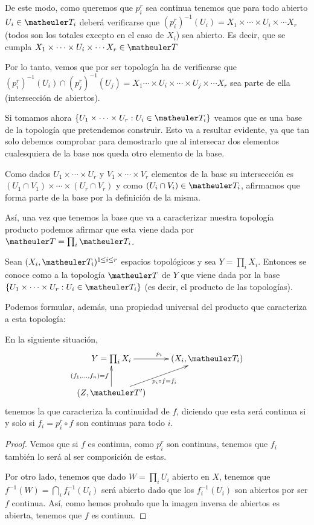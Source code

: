 De este modo, como queremos que $p_i^r$ sea continua  tenemos que para todo abierto $U_i\in \T_i$ deberá verificarse que $(p_i^r)^{-1}(U_i)=X_1\times\cdots\times U_i\times\cdots X_r$ (todos son los totales excepto en el caso de $X_i$) sea abierto. Es decir, que se cumpla $X_1\times\cdots\times U_i \times\cdots X_r\in \T$

Por lo tanto, vemos que por ser topología ha de verificarse que $(p_i^r)^{-1}(U_i)\cap (p_j^r)^{-1}(U_j)= X_1\cdots\times U_i \times\cdots\times U_j\times \cdots X_r$ sea parte de ella (intersección de abiertos).

Si tomamos ahora $ \{ U_1\times\cdots\times U_r : U_i\in \T_i \}$ veamos que es una base de la topología que pretendemos construir. Esto va a resultar evidente, ya que tan solo debemos comprobar para demostrarlo que al intersecar dos elementos cualesquiera de la base nos queda otro elemento de la base. 

Como dados $U_1\times\cdots\times U_r$ y $V_1\times\cdots\times V_r$ elementos de la base su intersección es $(U_1\cap V_1)\times\cdots\times (U_r\cap V_r)$ y como $(U_i\cap V_i)\in \T_i$, afirmamos que forma parte de la base por la definición de la misma.

Así, una vez que tenemos la base que va a caracterizar nuestra topología producto podemos afirmar que esta viene dada por $\T=\prod_i \T_i$.

\begin{defi}
	Sean $(X_{i },\T_{i})^{1\le i\le r}$ espacios topológicos y sea $Y=\prod_i X_i$. Entonces se conoce como  a la topología $\T$ de $Y$ que viene dada por la base $ \{ U_1\times\cdots\times U_r : U_i\in \T_i \}$ (es decir, el producto de las topologías).
\end{defi}

Podemos formular, además, una propiedad universal del producto que caracteriza a esta topología:

\begin{lem}
	En la siguiente situación,
	\[\xymatrix{
		Y=\prod_i X_i \ar[r]^{p_i} & 
		(X_i,\T_i) \\
		(Z,\T') \ar[u]^{(f_1,\dots,f_n)=f} \ar[ru]_{p_i\circ f=f_i} &
	}\]
	tenemos la  que caracteriza la continuidad de $f$, diciendo que esta será continua si y solo si $f_i=p_i^r\circ f$ son continuas para todo $i$.
	
	\begin{proof}
		Vemos que si $f$ es continua, como $p_i^r$ son continuas, tenemos que $f_i$ también lo será al ser composición de estas.
		
		Por otro lado, tenemos que dado $W=\prod_iU_i$ abierto en $X$, tenemos que $f^{-1}(W)=\bigcap_i f_i^{-1}(U_i)$ será abierto dado que los $f_i^{-1}(U_i)$ son abiertos por ser $f$ continua. Así, como hemos probado que la imagen inversa de abiertos es abierta, tenemos que $f$ es continua.
	\end{proof}
\end{lem}

